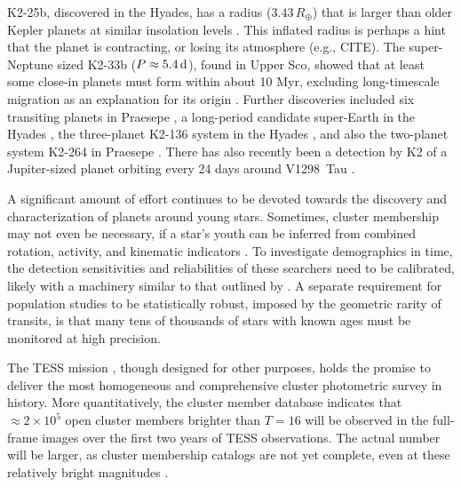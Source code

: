 \documentclass[12pt,twocolumn,tighten]{aastex62}
\begin{document}
K2-25b, discovered in the Hyades, has a radius ($3.43\,R_\oplus$) that
is larger than older Kepler planets at similar insolation levels
\citep{Mann_K2_25_2016}.  This inflated radius is perhaps a hint that
the planet is contracting, or losing its atmosphere (e.g., CITE).  The
super-Neptune sized K2-33b ($P\approx 5.4\,{\rm d}$), found in Upper
Sco, showed that at least some close-in planets must form within about
10 Myr, excluding long-timescale migration as an explanation for its
origin \citep{Mann_K2_33b_2016,David_et_al_2017}.  Further discoveries
included six transiting planets in Praesepe
\citep{obermeier_k2_2016,Mann_et_al_2017}, a long-period candidate
super-Earth in the Hyades \citep{vanderburg_zeitVII_2018}, the
three-planet K2-136 system in the Hyades
\citep{ciardi_k2-136_2018,livingston_three_2018,mann_ZEITVI_2018}, and
also the two-planet system K2-264 in Praesepe
\citep{rizzuto_zeitVIII_2018,livingston_k2-264_2019}.  There has also
recently been a detection by K2 of a Jupiter-sized planet orbiting
every 24 days around V1298~Tau \citep{david_v1298_2019}.

A significant amount of effort continues to be devoted towards the
discovery and characterization of planets around young stars.
Sometimes, cluster membership may not even be necessary, if a star's
youth can be inferred from combined rotation, activity, and kinematic
indicators \citep[{e.g.}, K2-233;][]{david_k2-233_2018}.  To
investigate demographics in time, the detection sensitivities and
reliabilities of these searchers need to be calibrated, likely with a
machinery similar to that outlined by \citet{rizzuto_zeitV_2017}.  A
separate requirement for population studies to be statistically
robust, imposed by the geometric rarity of transits, is that many tens
of thousands of stars with known ages must be monitored at high
precision.

The TESS mission \citep{ricker_transiting_2015}, though designed for
other purposes, holds the promise to deliver the most homogeneous and
comprehensive cluster photometric survey in history.  More
quantitatively, the \citet{Kharchenko_et_al_2013} cluster member
database indicates that $\approx 2\times10^5$ open cluster members
brighter than $T=16$ will be observed in the full-frame images over
the first two years of TESS observations.  The actual number will be
larger, as cluster membership catalogs are not yet complete, even at
these relatively bright magnitudes \citep[{\it
e.g.},][]{cantat-gaudin_gaia_2018,cantat-gaudin_newOCs_2019}.
\end{document}
